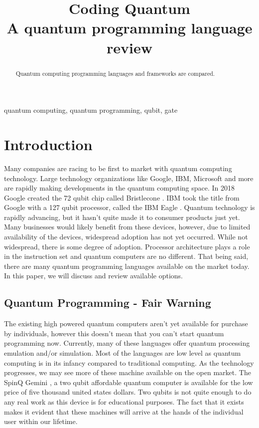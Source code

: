 \documentclass[conference]{IEEEtran}
\begin{document}
\title{ Coding Quantum \\
{\footnotesize A quantum programming language review}
}

\author{
}

\maketitle

\begin{abstract}
Quantum computing programming languages and frameworks are compared.
\end{abstract}

\begin{IEEEkeywords}
quantum computing, quantum programming, qubit, gate
\end{IEEEkeywords}

\section{Introduction}
Many companies are racing to be first to market with quantum computing technology. 
Large technology organizations like Google, IBM, Microsoft and more are rapidly making developments in the quantum computing space. 
In 2018 Google created the 72 qubit chip called Bristlecone \cite{b1}. 
IBM took the title from Google with a 127 qubit processor, called the IBM Eagle \cite{b2}. 
Quantum technology is rapidly advancing, but it hasn't quite made it to consumer products just yet. 
Many businesses would likely benefit from these devices, however, due to limited availability of the devices, widespread adoption has not yet occurred. 
While not widespread, there is some degree of adoption. 
Processor architecture plays a role in the instruction set and quantum computers are no different. 
That being said, there are many quantum programming languages available on the market today. 
In this paper, we will discuss and review available options. 


\subsection{Quantum Programming - Fair Warning}
The existing high powered quantum computers aren't yet available for purchase by individuals, however this doesn't mean that you can't start quantum programming now. 
Currently, many of these languages offer quantum processing emulation and/or simulation. 
Most of the languages are low level as quantum computing is in its infancy compared to traditional computing. 
As the technology progresses, we may see more of these machine available on the open market. 
The SpinQ Gemini \cite{b3}, a two qubit affordable quantum computer is available for the low price of five thousand united states dollars. 
Two qubits is not quite enough to do any real work as this device is for educational purposes. 
The fact that it exists makes it evident that these machines will arrive at the hands of the individual user within our lifetime.
\end{document}
